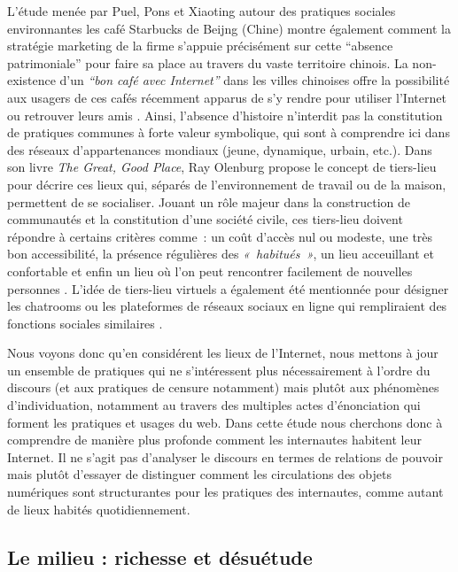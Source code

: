 L’étude menée par Puel, Pons et Xiaoting autour des pratiques sociales environnantes les café Starbucks de Beijng (Chine) montre également comment la stratégie marketing de la firme s’appuie précisément sur cette “absence patrimoniale” pour faire sa place au travers du vaste territoire chinois. La non-existence d’un \textit{“bon café avec Internet”} dans les villes chinoises offre la possibilité aux usagers de ces cafés récemment apparus de s’y rendre pour utiliser l’Internet ou retrouver leurs amis \citep{Puel2007}. Ainsi, l’absence d’histoire n’interdit pas la constitution de pratiques communes à forte valeur symbolique, qui sont à comprendre ici dans des réseaux d’appartenances mondiaux (jeune, dynamique, urbain, etc.). Dans son livre \textit{The Great, Good Place}, Ray Olenburg propose le concept de tiers-lieu pour décrire ces lieux qui, séparés de l’environnement de travail ou de la maison, permettent de se socialiser. Jouant un rôle majeur dans la construction de communautés et la constitution d’une société civile, ces tiers-lieu doivent répondre à certains critères comme : un coût d’accès nul ou modeste, une très bon accessibilité, la présence régulières des \textit{« habitués »}, un lieu acceuillant et confortable et enfin un lieu où l’on peut rencontrer facilement de nouvelles personnes \citep{Oldenburg1999}. L’idée de tiers-lieu virtuels a également été mentionnée pour désigner les chatrooms ou les plateformes de réseaux sociaux en ligne qui rempliraient des fonctions sociales similaires \citep{Soukup2006}. 

Nous voyons donc qu’en considérent les lieux de l’Internet, nous mettons à jour un ensemble de pratiques qui ne s’intéressent plus nécessairement à l’ordre du discours (et aux pratiques de censure notamment) mais plutôt aux phénomènes d’individuation, notamment au travers des multiples actes d’énonciation qui forment les pratiques et usages du web. Dans cette étude nous cherchons donc à comprendre de manière plus profonde comment les internautes habitent leur Internet. Il ne s’agit pas d’analyser le discours en termes de relations de pouvoir mais plutôt d’essayer de distinguer comment les circulations des objets numériques sont structurantes pour les pratiques des internautes, comme autant de lieux habités quotidiennement.

\subsection[Le milieu : richesse et désuétude ]{Le milieu : richesse et désuétude }

